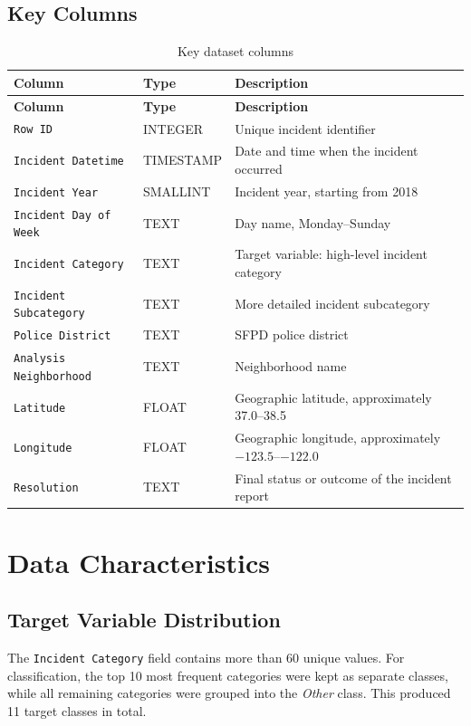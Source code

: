 \documentclass[12pt,a4paper]{article}
\begin{document}
\subsection{Key Columns}

\begin{longtable}{L{4cm} L{3cm} L{8cm}}
\caption{Key dataset columns}\\
\toprule
\textbf{Column} & \textbf{Type} & \textbf{Description} \\
\midrule
\endfirsthead
\toprule
\textbf{Column} & \textbf{Type} & \textbf{Description} \\
\midrule
\endhead
\texttt{Row ID} & INTEGER & Unique incident identifier \\
\texttt{Incident Datetime} & TIMESTAMP & Date and time when the incident occurred \\
\texttt{Incident Year} & SMALLINT & Incident year, starting from 2018 \\
\texttt{Incident Day of Week} & TEXT & Day name, Monday--Sunday \\
\texttt{Incident Category} & TEXT & Target variable: high-level incident category \\
\texttt{Incident Subcategory} & TEXT & More detailed incident subcategory \\
\texttt{Police District} & TEXT & SFPD police district \\
\texttt{Analysis Neighborhood} & TEXT & Neighborhood name \\
\texttt{Latitude} & FLOAT & Geographic latitude, approximately 37.0--38.5 \\
\texttt{Longitude} & FLOAT & Geographic longitude, approximately $-123.5$--$-122.0$ \\
\texttt{Resolution} & TEXT & Final status or outcome of the incident report \\
\bottomrule
\end{longtable}

\section{Data Characteristics}

\subsection{Target Variable Distribution}

The \texttt{Incident Category} field contains more than 60 unique values. For classification, the top 10 most frequent categories were kept as separate classes, while all remaining categories were grouped into the \textit{Other} class. This produced 11 target classes in total.
\end{document}
